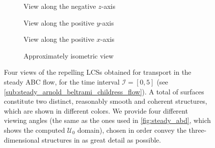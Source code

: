 \begin{figure}[htpb]
    \centering
    \hspace*{\fill}
    \begin{subfigure}[b]{0.42\textwidth}
        \centering
        \caption[]{{\small View along the negative $z$-axis}}
        \label{fig:steady_lcss_z}
    \end{subfigure}\hfill%
    \begin{subfigure}[b]{0.42\textwidth}
        \centering
        \caption[]{{\small View along the positive $y$-axis}}
        \label{fig:steady_lcss_y}
    \end{subfigure}%
    \hspace*{\fill}

    \hspace*{\fill}
    \begin{subfigure}[b]{0.42\textwidth}
        \centering
        \caption[]{{\small View along the positive $x$-axis}}
        \label{fig:steady_lcss_x}
    \end{subfigure}\hfill%
    \begin{subfigure}[b]{0.42\textwidth}
        \centering
        \caption[]{{\small Approximately isometric view}}
        \label{fig:steady_lcss_isometric}
    \end{subfigure}%
    \hspace*{\fill}
    \caption[Four views of the repelling LCSs obtained for transport in the
    steady ABC flow]
    {
        Four views of the repelling LCSs obtained for transport in the steady
        ABC flow, for the time interval $\mathcal{I}=[0,5]$ (see
        \cref{sub:steady_arnold_beltrami_childress_flow}). A total of
         surfaces constitute two distinct, reasonably smooth and
        coherent structures, which are shown in different colors. We provide
        four different viewing angles (the same as the ones used in
        \cref{fig:steady_abd}, which shows the computed $\mathcal{U}_{0}$
        domain), chosen in order convey the three-dimensional structures in as
        great detail as possible.
}
    \label{fig:steady_lcss}
\end{figure}

